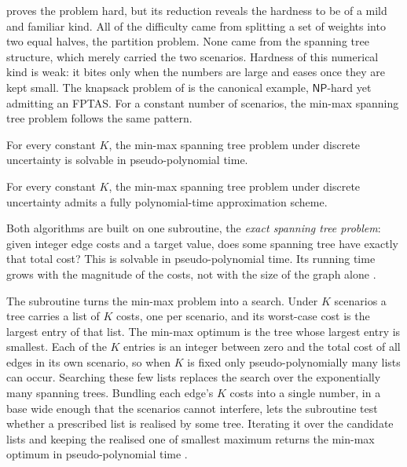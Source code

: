  proves the problem hard, but its reduction reveals the hardness to be of a mild and familiar kind.
All of the difficulty came from splitting a set of weights into two equal halves, the partition problem. None came from the spanning tree structure, which merely carried the two scenarios.
Hardness of this numerical kind is weak: it bites only when the numbers are large and eases once they are kept small.
The knapsack problem of  is the canonical example, $\mathsf{NP}$-hard yet admitting an FPTAS. For a constant number of scenarios, the min-max spanning tree problem follows the same pattern.

\begin{theorem}\label{thm:mm-kconst-pseudo}
For every constant $K$, the min-max spanning tree problem under discrete uncertainty is solvable in pseudo-polynomial time.
\end{theorem}

\begin{theorem}[FPTAS]\label{thm:mm-kconst-fptas}
For every constant $K$, the min-max spanning tree problem under discrete uncertainty admits a fully polynomial-time approximation scheme.
\end{theorem}

Both algorithms are built on one subroutine, the \emph{\textcolor{RWTHBlue}{exact spanning tree problem}}: given integer edge costs and a target value, does some spanning tree have exactly that total cost?
This is solvable in pseudo-polynomial time. Its running time grows with the magnitude of the costs, not with the size of the graph alone \cite{BarahonaPulleyblank1987}.

The subroutine turns the min-max problem into a search.
Under $K$ scenarios a tree carries a list of $K$ costs, one per scenario, and its worst-case cost is the largest entry of that list. The min-max optimum is the tree whose largest entry is smallest.
Each of the $K$ entries is an integer between zero and the total cost of all edges in its own scenario, so when $K$ is fixed only pseudo-polynomially many lists can occur. Searching these few lists replaces the search over the exponentially many spanning trees.
Bundling each edge's $K$ costs into a single number, in a base wide enough that the scenarios cannot interfere, lets the subroutine test whether a prescribed list is realised by some tree. Iterating it over the candidate lists and keeping the realised one of smallest maximum returns the min-max optimum in pseudo-polynomial time \cite[Theorem~8.2]{Goerigk2021RCO}.

